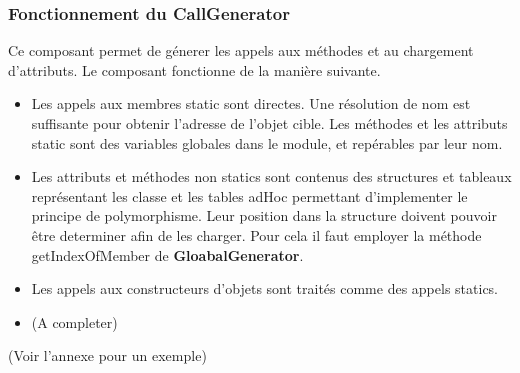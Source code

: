 \documentclass{article}
\begin{document}
   \subsubsection{Fonctionnement du CallGenerator}
   Ce composant permet de génerer les appels aux méthodes et au chargement d'attributs. Le composant fonctionne de la manière suivante.
  \begin{itemize}
    \item Les appels aux membres static sont directes. Une résolution de nom est suffisante pour obtenir l'adresse de l'objet cible. Les méthodes et les attributs static sont des variables globales dans le module, et repérables par leur nom.

    \item Les attributs et méthodes non statics sont contenus des structures et tableaux représentant les classe et les tables adHoc permettant d'implementer le principe de polymorphisme. Leur position dans  la structure doivent pouvoir être determiner afin de les charger. Pour cela il faut employer la méthode getIndexOfMember de \textbf{GloabalGenerator}.

    \item Les appels aux constructeurs d'objets sont traités comme des appels statics.

    \item (A completer)
  \end{itemize} 

   \small{(Voir l'annexe pour un exemple)}
\end{document}
